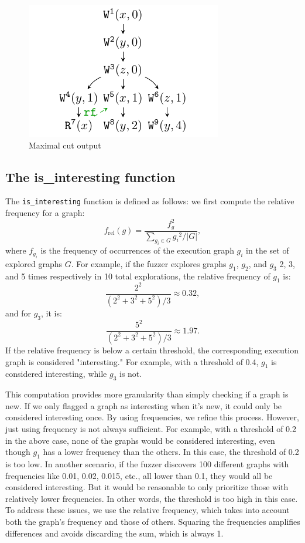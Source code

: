 \begin{figure}[htbp]
	\centering
	\includegraphics[scale=1]{figure/cuts/cut-maximal.pdf}
	\caption{Maximal cut output}
	\label{cut:maximal}
\end{figure}


\subsection{The is\_interesting function}



The \texttt{is\_interesting} function is defined as follows: we first compute the relative frequency for a graph:
\[
f_{\text{rel}}(g) = \frac{f_g^2}{\sum_{g_i \in G} {g_i}^2 / |G| },
\]
where \( f_{g_i} \) is the frequency of occurrences of the execution graph \( g_i \) in the set of explored graphs \( G \). For example, if the fuzzer explores graphs \( g_1 \), \( g_2 \), and \( g_3 \) 2, 3, and 5 times respectively in 10 total explorations, the relative frequency of \( g_1 \) is:
\[
\frac{2^2}{\left(2^2 + 3^2 + 5^2\right) / 3} \approx 0.32,
\]
and for \( g_3 \), it is:
\[
\frac{5^2}{\left(2^2 + 3^2 + 5^2\right) / 3} \approx 1.97.
\]
If the relative frequency is below a certain threshold, the corresponding execution graph is considered "interesting." For example, with a threshold of 0.4, \( g_1 \) is considered interesting, while \( g_3 \) is not.

This computation provides more granularity than simply checking if a graph is new. If we only flagged a graph as interesting when it's new, it could only be considered interesting once. By using frequencies, we refine this process. However, just using frequency is not always sufficient. For example, with a threshold of 0.2 in the above case, none of the graphs would be considered interesting, even though \( g_1 \) has a lower frequency than the others. In this case, the threshold of 0.2 is too low. In another scenario, if the fuzzer discovers 100 different graphs with frequencies like 0.01, 0.02, 0.015, etc., all lower than 0.1, they would all be considered interesting. But it would be reasonable to only prioritize those with relatively lower frequencies. In other words, the threshold is too high in this case. To address these issues, we use the relative frequency, which takes into account both the graph's frequency and those of others. Squaring the frequencies amplifies differences and avoids discarding the sum, which is always 1.


